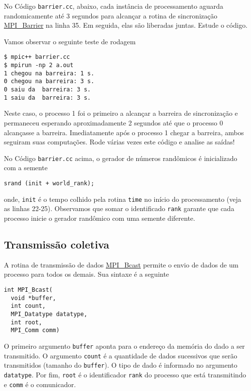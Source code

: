 \begin{ex}
  No Código \verb+barrier.cc+, abaixo, cada instância de processamento aguarda randomicamente até 3 segundos para alcançar a rotina de sincronização \href{https://www.open-mpi.org/doc/current/man3/MPI\_Barrier.3.php}{MPI\_Barrier} na linha 35. Em seguida, elas são liberadas juntas. Estude o código.



Vamos observar o seguinte teste de rodagem
\begin{verbatim}
$ mpic++ barrier.cc
$ mpirun -np 2 a.out                                                          
1 chegou na barreira: 1 s.
0 chegou na barreira: 3 s.
0 saiu da  barreira: 3 s.
1 saiu da  barreira: 3 s.
\end{verbatim}
Neste caso, o processo 1 foi o primeiro a alcançar a barreira de sincronização e permaneceu esperando aproximadamente 2 segundos até que o processo 0 alcançasse a barreira. Imediatamente após o processo 1 chegar a barreira, ambos seguiram suas computações. Rode várias vezes este código e analise as saídas!
\end{ex}

\begin{obs}
  No Código \verb+barrier.cc+ acima, o gerador de números randômicos é inicializado com a semente
\begin{verbatim}
srand (init + world_rank);
\end{verbatim}
  onde, \verb+init+ é o tempo colhido pela rotina \verb+time+ no início do processamento (veja as linhas 22-25). Observamos que somar o identificado \verb+rank+ garante que cada processo inicie o gerador randômico com uma semente diferente.
\end{obs}

\subsection {Transmissão coletiva}

A rotina de transmissão de dados \href{https://www.open-mpi.org/doc/current/man3/MPI\_Bcast.3.php}{MPI\_Bcast} permite o envio de dados de um processo para todos os demais. Sua sintaxe é a seguinte
\begin{verbatim}
int MPI_Bcast(
  void *buffer, 
  int count, 
  MPI_Datatype datatype,
  int root, 
  MPI_Comm comm)
\end{verbatim}
O primeiro argumento \verb+buffer+ aponta para o endereço da memória do dado a ser transmitido. O argumento \verb+count+ é a quantidade de dados sucessivos que serão transmitidos (tamanho do \verb+buffer+). O tipo de dado é informado no argumento \verb+datatype+. Por fim, \verb+root+ é o identificador \verb+rank+ do processo que está transmitindo e \verb+comm+ é o comunicador.


